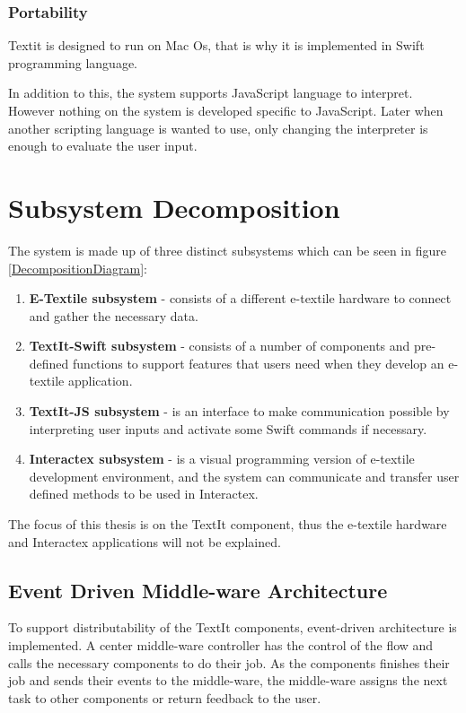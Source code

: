 	\subsubsection{Portability} 
	Textit is designed to run on Mac Os, that is why it is implemented in Swift programming language.
	
	In addition to this, the system supports JavaScript language to interpret. However nothing on the system is developed specific to JavaScript. Later when another scripting language is wanted to use, only changing the interpreter is enough to evaluate the user input.
		
\section{Subsystem Decomposition}
The system is made up of three distinct subsystems which can be seen in figure \ref{DecompositionDiagram}:
\begin{enumerate}
\item \textbf{E-Textile subsystem} - consists of a different e-textile hardware to connect and gather the necessary data.
\item \textbf{TextIt-Swift subsystem} - consists of a number of components and pre-defined functions to support features that users need when they develop an e-textile application.
\item \textbf{TextIt-JS subsystem} - is an interface to make communication possible by interpreting user inputs and activate some Swift commands if necessary.
\item \textbf{Interactex subsystem} - is a visual programming version of e-textile development environment, and the system can communicate and transfer user defined methods to be used in Interactex.
\end{enumerate}

The focus of this thesis is on the TextIt component, thus the e-textile hardware and Interactex applications will not be explained.


\subsection{Event Driven Middle-ware Architecture}
To support distributability of the TextIt components, event-driven architecture is implemented. A center middle-ware controller has the control of the flow and calls the necessary components to do their job. As the components finishes their job  and sends their events to the middle-ware, the middle-ware assigns the next task to other components or return feedback to the user.

